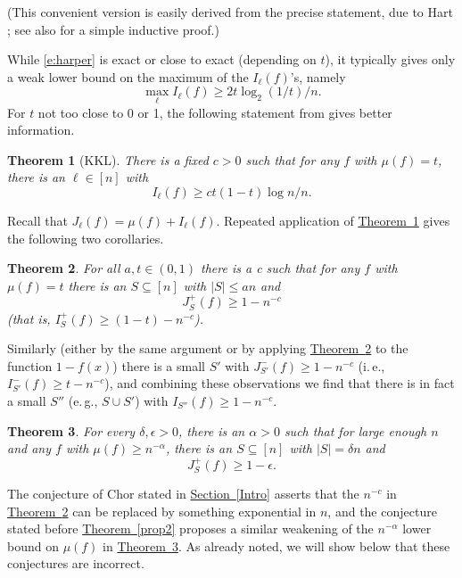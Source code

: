 \documentclass[11pt]{article}
\numberwithin{equation}{section}
\theoremstyle{definition}
\theoremstyle{plain}
\newcommand{\ie}{i.\,e.}
\newcommand{\eg}{e.\,g.}
\newcommand{\expref}[2]{\hyperref[#2]{#1~\ref{#2}}}
\newtheorem{thm}{Theorem}[section]
\newcommand{\mn}[0]{\medskip\noindent}
\newcommand{\nin}[0]{\noindent}
\newcommand{\sub}[0]{\subseteq}
\newcommand{\0}[0]{\emptyset}
\newcommand{\ga}[0]{\alpha }
\begin{document}
\mn
(This convenient version is easily derived from the precise
statement, due to Hart \cite{Hart}; see also \cite[Sec. 7]{KK07}
for a simple inductive proof.)

\mn
While \eqref{e:harper} is exact or close to exact
(depending on $t$), it typically gives
only a weak lower bound on the maximum of the %
$I_\ell (f)$'s,   %
namely
\begin {equation}
\label {e:harper-max}
\max_\ell I_\ell (f) \ge  2t \log_2 (1/t)/n.
\end {equation}
For $t$ not too close to 0 or 1, the
following
statement from \cite{kkl} gives
better information.


\begin{thm} [KKL]
\label {t:kkl}
There is a fixed $c>0$ such that
for any
$f$ with $\mu(f) =t$,
there is an $\ell \in [n]$ with
\begin {equation}
\label {e:kkl}
I_\ell (f) \ge c t (1-t)\log n/n.
\end {equation}
\end {thm}
\nin
Recall that $J_\ell (f)=\mu(f) +I_\ell (f)$. Repeated application of \expref{Theorem}{t:kkl} gives
the following two corollaries.

\begin {thm}
\label {t:ra1}
For all $a, t\in (0,1)$ there is a c such that
for any
$f$ with $\mu(f) =t$ there
is an $S\sub [n]$ with $|S|\leq an$ and
$$J^+_S(f) \ge 1 - n^{-c}$$ (that is,
$I^+_S(f) \ge (1-t) - n^{-c}$).

\end {thm}
\nin
Similarly (either by the same argument or by applying
\expref{Theorem}{t:ra1} to the function $1-f(x)$)
there is a small $S'$
with
$J^-_{S'}(f) \ge 1 - n^{-c}$ (\ie, $I^-_{S'}(f) \ge t - n^{-c}$),
and combining these observations we find that there is
in fact a small $S''$ (\eg, $S \cup S'$) with
$I_{S''}(f) \ge 1-n^{-c}$.


\begin {thm}
\label {t:ra2}
For every $\delta, \epsilon >0$,
there is an $\ga>0$ such that for large enough
$n$ and any
$f$ with $\mu(f) \geq  n^{-\ga}$,
there is an $S\sub [n]$ with $|S|=\delta n$ and
 $$J^+_S(f) \ge 1-\epsilon.$$
\end {thm}


\mn
The conjecture of
Chor stated in \expref{Section}{Intro}
asserts that the $n^{-c}$ in
\expref{Theorem}{t:ra1} can be replaced
by something exponential in $n$,
and the conjecture stated before
\expref{Theorem}{prop2} proposes a similar weakening
of the $n^{-\ga}$ lower bound on $\mu(f) $ in
\expref{Theorem}{t:ra2}.
As already noted, we
will show below that these conjectures are incorrect.
\end{document}
